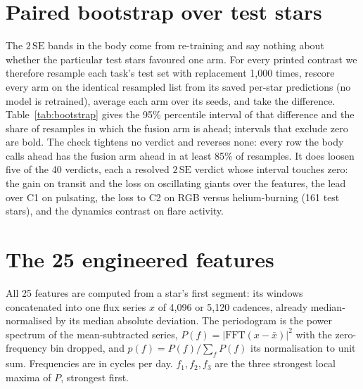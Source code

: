 \documentclass{article}
\begin{document}
\section{Paired bootstrap over test stars}
\label{app:bootstrap}

The $2\,\mathrm{SE}$ bands in the body come from re-training and say nothing about whether the
particular test stars favoured one arm. For every printed contrast we therefore resample each task's
test set with replacement 1{,}000 times, rescore every arm on the identical resampled list from its
saved per-star predictions (no model is retrained), average each arm over its seeds, and take the
difference. Table~\ref{tab:bootstrap} gives the 95\% percentile interval of that difference and the
share of resamples in which the fusion arm is ahead; intervals that exclude zero are bold. The check
tightens no verdict and reverses none: every row the body calls ahead has the fusion arm ahead in at
least 85\% of resamples. It does loosen five of the 40 verdicts, each a resolved $2\,\mathrm{SE}$
verdict whose interval touches zero: the gain on transit and the loss on oscillating giants over the
features, the lead over C1 on
pulsating, the loss to C2 on RGB versus helium-burning (161 test stars), and the dynamics contrast on
flare activity.

\begin{table}[H]
\caption{Paired star-bootstrap of the four contrasts the body counts. Each entry is the 95\% interval
of (left arm $-$ right arm) over 1{,}000 resamples of the test stars, seeds averaged, and the share of
resamples with the difference above zero ($f_{>0}$; 1.00 means the left arm is ahead in every
resample, 0.00 that it is behind in every resample). Bold: interval excludes zero.}
\label{tab:bootstrap}
\centering
\scriptsize
\setlength{\tabcolsep}{2pt}

\end{table}

\section{The 25 engineered features}
\label{app:features}

All 25 features are computed from a star's first segment: its windows concatenated into one flux
series $x$ of 4{,}096 or 5{,}120 cadences, already median-normalised by its median absolute
deviation. The periodogram is the power spectrum of the mean-subtracted series,
$P(f) = |\mathrm{FFT}(x - \bar{x})|^{2}$ with the zero-frequency bin dropped, and
$p(f) = P(f)/\sum_f P(f)$ its normalisation to unit sum. Frequencies are in cycles per day.
$f_{1}, f_{2}, f_{3}$ are the three strongest local maxima of $P$, strongest first.
\end{document}
